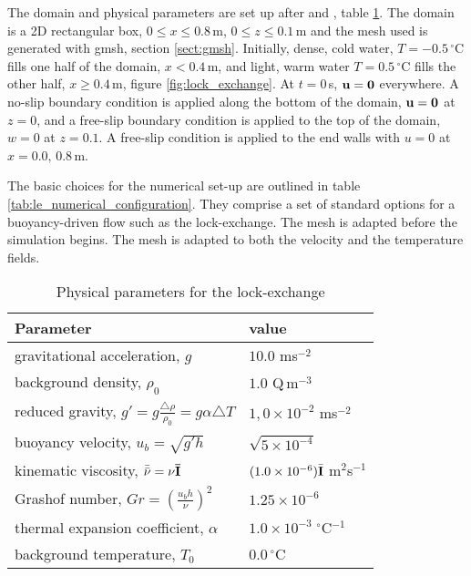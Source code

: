 The domain and physical parameters are set up after \cite{fringer_06} and \cite{ozgokmen_07}, table \ref{tab:le_physical_parameters}. The domain is a 2D rectangular box, $0\leq x \leq 0.8\,$m, $0 \leq z \leq 0.1\,$m and the mesh used is generated with gmsh, section \ref{sect:gmsh}. Initially, dense, cold water, $T = -0.5\,^\circ$C fills one half of the domain, $x<0.4\,$m, and light, warm water $T = 0.5\,^\circ$C fills the other half, $x\geq0.4\,$m, figure \ref{fig:lock_exchange}. At $t=0\,$s, ${\bf u} = {\bf 0}$ everywhere. A no-slip boundary condition is applied along the bottom of the domain, ${\bf u = 0}$ at $z=0$, and a free-slip boundary condition is applied to the top of the domain, $w = 0$ at $z = 0.1$. A free-slip condition is applied to the end walls with $u=0$ at $x = 0.0,\, 0.8\,$m.

The basic choices for the numerical set-up are outlined in table \ref{tab:le_numerical_configuration}. They comprise a set of standard options for a buoyancy-driven flow such as the lock-exchange. The mesh is adapted before the simulation begins. The mesh is adapted to both the velocity and the temperature fields.  

\begin{table}[th]
\centering
\begin{tabular}[h]{ll}  \hline
Parameter                                                                     & value \\ \hline
gravitational acceleration, $g$                                               & $10.0$ ms$^{-2}$ \\
background density, $\rho_0$                                                  & $1.0$ Q$\,$m$^{-3}$ \\
reduced gravity, $g' = g\frac{\triangle \rho}{\rho_0} = g\alpha \triangle T $ & $1,0 \times 10^{-2}$ ms$^{-2}$ \\
buoyancy velocity, $u_b = \sqrt{g'h}$                                         & $\sqrt{5 \times 10^{-4}}$ \\
kinematic viscosity, $\bar{\bar{\bf \nu}} = \nu\bar{\bf I}$                   & $(1.0 \times 10^{-6})\bar{\bf I}$ m$^2$s$^{-1}$ \\
Grashof number, $Gr = \left( \frac{u_bh}{\nu} \right)^2$                      & $1.25 \times 10^{-6}$\\
thermal expansion coefficient, $\alpha$                                       & $1.0 \times 10^{-3} \;^\circ$C$^{-1}$ \\
background temperature, $T_0$                                                 & $0.0\,^{\circ}$C \\ \hline
\end{tabular}
\caption{Physical parameters for the lock-exchange}
\label{tab:le_physical_parameters}
\end{table}

